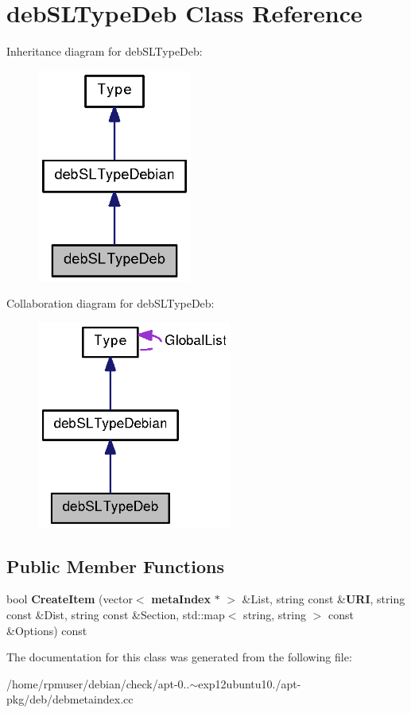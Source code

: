 \section{deb\-S\-L\-Type\-Deb \-Class \-Reference}
\label{classdebSLTypeDeb}


\-Inheritance diagram for deb\-S\-L\-Type\-Deb\-:
\nopagebreak
\begin{figure}[H]
\begin{center}
\leavevmode
\includegraphics[width=144pt]{classdebSLTypeDeb__inherit__graph}
\end{center}
\end{figure}


\-Collaboration diagram for deb\-S\-L\-Type\-Deb\-:
\nopagebreak
\begin{figure}[H]
\begin{center}
\leavevmode
\includegraphics[width=181pt]{classdebSLTypeDeb__coll__graph}
\end{center}
\end{figure}
\subsection*{\-Public \-Member \-Functions}
\begin{DoxyCompactItemize}
\item 
bool {\bfseries \-Create\-Item} (vector$<$ {\bf meta\-Index} $\ast$ $>$ \&\-List, string const \&{\bf \-U\-R\-I}, string const \&\-Dist, string const \&\-Section, std\-::map$<$ string, string $>$ const \&\-Options) const \label{classdebSLTypeDeb_a8776fe2f559ba3004185193a04c1a974}

\end{DoxyCompactItemize}


\-The documentation for this class was generated from the following file\-:\begin{DoxyCompactItemize}
\item 
/home/rpmuser/debian/check/apt-\/0..$\sim$exp12ubuntu10./apt-\/pkg/deb/debmetaindex.\-cc\end{DoxyCompactItemize}
